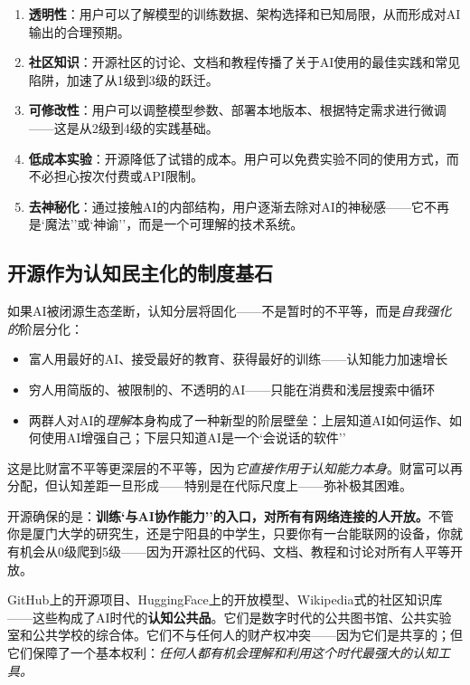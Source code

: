 \documentclass[12pt,a4paper]{ctexart}
\begin{document}
\begin{enumerate}[label=(\arabic*)]
\item \textbf{透明性}：用户可以了解模型的训练数据、架构选择和已知局限，从而形成对AI输出的合理预期。
\item \textbf{社区知识}：开源社区的讨论、文档和教程传播了关于AI使用的最佳实践和常见陷阱，加速了从1级到3级的跃迁。
\item \textbf{可修改性}：用户可以调整模型参数、部署本地版本、根据特定需求进行微调——这是从2级到4级的实践基础。
\item \textbf{低成本实验}：开源降低了试错的成本。用户可以免费实验不同的使用方式，而不必担心按次付费或API限制。
\item \textbf{去神秘化}：通过接触AI的内部结构，用户逐渐去除对AI的神秘感——它不再是`魔法''或`神谕''，而是一个可理解的技术系统。
\end{enumerate}

\subsection{开源作为认知民主化的制度基石}

如果AI被闭源生态垄断，认知分层将固化——不是暂时的不平等，而是\emph{自我强化的}阶层分化：

\begin{itemize}
\item 富人用最好的AI、接受最好的教育、获得最好的训练——认知能力加速增长
\item 穷人用简版的、被限制的、不透明的AI——只能在消费和浅层搜索中循环
\item 两群人对AI的\emph{理解}本身构成了一种新型的阶层壁垒：上层知道AI如何运作、如何使用AI增强自己；下层只知道AI是一个`会说话的软件''
\end{itemize}

这是比财富不平等更深层的不平等，因为\textit{它直接作用于认知能力本身}。财富可以再分配，但认知差距一旦形成——特别是在代际尺度上——弥补极其困难。

开源确保的是：\textbf{训练`与AI协作能力''的入口，对所有有网络连接的人开放。}不管你是厦门大学的研究生，还是宁阳县的中学生，只要你有一台能联网的设备，你就有机会从0级爬到5级——因为开源社区的代码、文档、教程和讨论对所有人平等开放。

GitHub上的开源项目、HuggingFace上的开放模型、Wikipedia式的社区知识库——这些构成了AI时代的\textbf{认知公共品}。它们是数字时代的公共图书馆、公共实验室和公共学校的综合体。它们不与任何人的财产权冲突——因为它们是共享的；但它们保障了一个基本权利：\textit{任何人都有机会理解和利用这个时代最强大的认知工具。}
\end{document}
